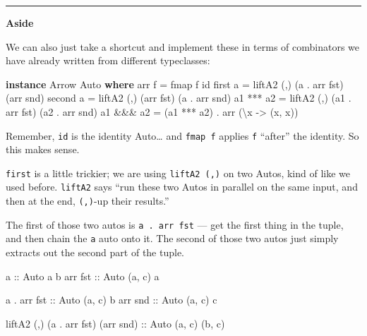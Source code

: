 \documentclass[]{article}
\newenvironment{Shaded}{}{}
\newcommand{\DataTypeTok}[1]{\textcolor[rgb]{0.56,0.13,0.00}{#1}}
\newcommand{\FunctionTok}[1]{\textcolor[rgb]{0.02,0.16,0.49}{#1}}
\newcommand{\KeywordTok}[1]{\textcolor[rgb]{0.00,0.44,0.13}{\textbf{#1}}}
\newcommand{\NormalTok}[1]{#1}
\newcommand{\OperatorTok}[1]{\textcolor[rgb]{0.40,0.40,0.40}{#1}}
\newcommand{\OtherTok}[1]{\textcolor[rgb]{0.00,0.44,0.13}{#1}}
\begin{document}
\begin{center}\rule{0.5\linewidth}{0.5pt}\end{center}

\textbf{Aside}

We can also just take a shortcut and implement these in terms of combinators we
have already written from different typeclasses:

\begin{Shaded}
\begin{Highlighting}[]
\KeywordTok{instance} \DataTypeTok{Arrow} \DataTypeTok{Auto} \KeywordTok{where}
\NormalTok{    arr f     }\OtherTok{=} \FunctionTok{fmap}\NormalTok{ f }\FunctionTok{id}
\NormalTok{    first a   }\OtherTok{=}\NormalTok{ liftA2 (,) (a  }\OperatorTok{.}\NormalTok{ arr }\FunctionTok{fst}\NormalTok{) (arr }\FunctionTok{snd}\NormalTok{)}
\NormalTok{    second a  }\OtherTok{=}\NormalTok{ liftA2 (,) (arr }\FunctionTok{fst}\NormalTok{)      (a  }\OperatorTok{.}\NormalTok{ arr }\FunctionTok{snd}\NormalTok{)}
\NormalTok{    a1 }\OperatorTok{***}\NormalTok{ a2 }\OtherTok{=}\NormalTok{ liftA2 (,) (a1 }\OperatorTok{.}\NormalTok{ arr }\FunctionTok{fst}\NormalTok{) (a2 }\OperatorTok{.}\NormalTok{ arr }\FunctionTok{snd}\NormalTok{)}
\NormalTok{    a1 }\OperatorTok{\&\&\&}\NormalTok{ a2 }\OtherTok{=}\NormalTok{ (a1 }\OperatorTok{***}\NormalTok{ a2) }\OperatorTok{.}\NormalTok{ arr (\textbackslash{}x }\OtherTok{{-}\textgreater{}}\NormalTok{ (x, x))}
\end{Highlighting}
\end{Shaded}

Remember, \texttt{id} is the identity Auto\ldots{} and \texttt{fmap\ f} applies
\texttt{f} ``after'' the identity. So this makes sense.

\texttt{first} is a little trickier; we are using \texttt{liftA2\ (,)} on two
Autos, kind of like we used before. \texttt{liftA2} says ``run these two Autos
in parallel on the same input, and then at the end, \texttt{(,)}-up their
results.''

The first of those two autos is \texttt{a\ .\ arr\ fst} --- get the first thing
in the tuple, and then chain the \texttt{a} auto onto it. The second of those
two autos just simply extracts out the second part of the tuple.

\begin{Shaded}
\begin{Highlighting}[]
\OtherTok{a           ::} \DataTypeTok{Auto}\NormalTok{ a b}
\NormalTok{arr}\OtherTok{ fst     ::} \DataTypeTok{Auto}\NormalTok{ (a, c) a}

\NormalTok{a }\OperatorTok{.}\NormalTok{ arr}\OtherTok{ fst ::} \DataTypeTok{Auto}\NormalTok{ (a, c) b}
\NormalTok{arr}\OtherTok{ snd     ::} \DataTypeTok{Auto}\NormalTok{ (a, c) c}

\NormalTok{liftA2 (,) (a }\OperatorTok{.}\NormalTok{ arr }\FunctionTok{fst}\NormalTok{) (arr }\FunctionTok{snd}\NormalTok{)}\OtherTok{ ::} \DataTypeTok{Auto}\NormalTok{ (a, c) (b, c)}
\end{Highlighting}
\end{Shaded}
\end{document}
